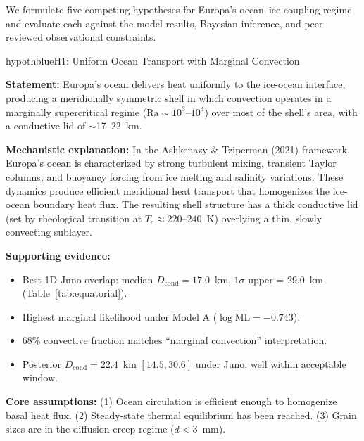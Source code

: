 \documentclass[11pt,letterpaper]{article}
\begin{document}
We formulate five competing hypotheses for Europa's ocean--ice coupling regime and evaluate each against the model results, Bayesian inference, and peer-reviewed observational constraints.

\newpage
\begin{hypothesisbox}{hypothblue}{H1: Uniform Ocean Transport with Marginal Convection}

\textbf{Statement:} Europa's ocean delivers heat uniformly to the ice-ocean interface, producing a meridionally symmetric shell in which convection operates in a marginally supercritical regime ($\mathrm{Ra} \sim 10^3$--$10^4$) over most of the shell's area, with a conductive lid of $\sim$17--22~km.

\textbf{Mechanistic explanation:} In the Ashkenazy \& Tziperman (2021) framework, Europa's ocean is characterized by strong turbulent mixing, transient Taylor columns, and buoyancy forcing from ice melting and salinity variations. These dynamics produce efficient meridional heat transport that homogenizes the ice-ocean boundary heat flux. The resulting shell structure has a thick conductive lid (set by rheological transition at $T_c \approx 220$--$240$~K) overlying a thin, slowly convecting sublayer.

\textbf{Supporting evidence:}
\begin{itemize}[nosep]
  \item Best 1D Juno overlap: median $D_\mathrm{cond} = 17.0$~km, $1\sigma$ upper = 29.0~km (Table~\ref{tab:equatorial}).
  \item Highest marginal likelihood under Model A ($\log \mathrm{ML} = -0.743$).
  \item 68\% convective fraction matches ``marginal convection'' interpretation.
  \item Posterior $D_\mathrm{cond} = 22.4$~km $[14.5, 30.6]$ under Juno, well within acceptable window.
\end{itemize}

\textbf{Core assumptions:} (1) Ocean circulation is efficient enough to homogenize basal heat flux. (2) Steady-state thermal equilibrium has been reached. (3) Grain sizes are in the diffusion-creep regime ($d < 3$~mm).
\end{hypothesisbox}
\end{document}
